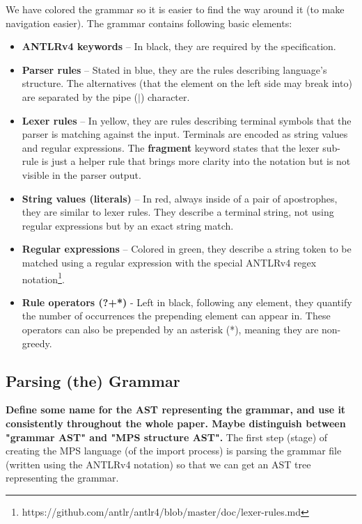 \documentclass[10pt]{sigplanconf}
\newcommand{\todo}[1]{{\bfseries #1}}
\newcommand{\antlrparserrule}[1]{\textcolor{antlrparserrulecolor}{#1}}
\newcommand{\antlrlexerrule}[1]{\textcolor{antlrlexerrulecolor}{#1}}
\newcommand{\antlrliteralnoap}[1]{\textcolor{antlrliteralcolor}{#1}}
\newcommand{\antlrregex}[1]{\textcolor{antlrregexcolor}{#1}}
\begin{document}
We have colored the grammar so it is easier to find the way around it (to make navigation easier).
The grammar contains following basic elements:

\begin{itemize}
	\item \textbf{ANTLRv4 keywords} -- In black, they are required by the specification.
	\item \antlrparserrule{\textbf{Parser rules}} -- Stated in blue, they are the rules describing language's structure.
		The alternatives (that the element on the left side may break into) are separated by the pipe ($|$) character.
	\item \antlrlexerrule{\textbf{Lexer rules}} -- In yellow, they are rules describing terminal symbols that the parser is matching against the input.
		Terminals are encoded as string values and regular expressions.
		The \textbf{fragment} keyword states that the lexer sub-rule is just a helper rule that brings more clarity into the notation but is not visible in the parser output.
	\item \antlrliteralnoap{\textbf{String values (literals)}} -- In red, always inside of a pair of apostrophes, they are similar to lexer rules.
		They describe a terminal string, not using regular expressions but by an exact string match.
	\item \antlrregex{\textbf{Regular expressions}} -- Colored in green, they describe a string token to be matched using a regular expression with the special ANTLRv4 regex notation\footnote{https://github.com/antlr/antlr4/blob/master/doc/lexer-rules.md}.
	\item \textbf{Rule operators (?+*)} - Left in black, following any element, they quantify the number of occurrences the prepending element can appear in.
		These operators can also be prepended by an asterisk (*), meaning they are non-greedy.
\end{itemize}

\subsection{Parsing (the) Grammar}

\todo{Define some name for the AST representing the grammar, and use it consistently throughout the whole paper. Maybe distinguish between "grammar AST" and "MPS structure AST".}
The first step (stage) of creating the MPS language (of the import process) is parsing the grammar file (written using the ANTLRv4 notation) so that we can get an AST tree representing the grammar.
\end{document}
